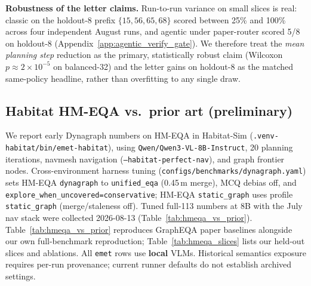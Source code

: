 \noindent\textbf{Robustness of the letter claims.}
Run-to-run variance on small slices is real: classic on the holdout-8 prefix $\{15,56,65,68\}$ scored between 25\% and 100\% across four independent August runs, and agentic under paper-router scored 5/8 on holdout-8 (Appendix~\ref{app:agentic_verify_gate}).
We therefore treat the \emph{mean planning step} reduction as the primary, statistically robust claim (Wilcoxon $p{\approx}2{\times}10^{-5}$ on balanced-32) and the letter gains on holdout-8 as the matched same-policy headline, rather than overfitting to any single draw.

\subsection{Habitat HM-EQA vs.\ prior art (preliminary)}
\label{sec:hmeqa_results}

We report early Dynagraph numbers on HM-EQA in Habitat-Sim (\texttt{.venv-habitat/bin/emet-habitat}), using \texttt{Qwen/Qwen3-VL-8B-Instruct}, 20 planning iterations, navmesh navigation (\texttt{--habitat-perfect-nav}), and graph frontier nodes.
Cross-environment harness tuning (\texttt{configs/benchmarks/dynagraph.yaml}) sets HM-EQA \texttt{dynagraph} to \texttt{unified\_eqa} (0.45\,m merge), MCQ debias off, and \texttt{explore\_when\_uncovered=conservative}; HM-EQA \texttt{static\_graph} uses profile \texttt{static\_graph} (merge/staleness off).
Tuned full-113 numbers at 8B with the July nav stack were collected 2026-08-13 (Table~\ref{tab:hmeqa_vs_prior}).
Table~\ref{tab:hmeqa_vs_prior} reproduces GraphEQA paper baselines alongside our own full-benchmark reproduction; Table~\ref{tab:hmeqa_slices} lists our held-out slices and ablations.
All \texttt{emet} rows use \textbf{local} VLMs. Historical semantics exposure requires per-run provenance; current runner defaults do not establish archived settings.

